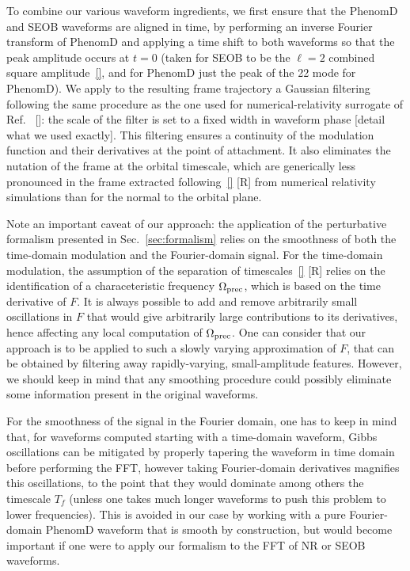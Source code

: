 \documentclass[aps,showpacs,twocolumn,
prd,superscriptaddress,nofootinbib]{revtex4-1}
\newcommand{\Tf}{T_{f}}
\newcommand{\SM}[1]{{\color{Red} #1}}
\begin{document}
To combine our various waveform ingredients, we first ensure that the PhenomD and SEOB waveforms are aligned in time, by performing an inverse Fourier transform of PhenomD and applying a time shift to both waveforms so that the peak amplitude occurs at $t=0$ (taken for SEOB to be the $\ell=2$ combined square amplitude~\eqref{}, and for PhenomD just the peak of the 22 mode for PhenomD). We apply to the resulting frame trajectory a Gaussian filtering following the same procedure as the one used for numerical-relativity surrogate of Ref.~\cite{} \SM{[]}: the scale of the filter is set to a fixed width in waveform phase \SM{[detail what we used exactly]}. This filtering ensures a continuity of the modulation function and their derivatives at the point of attachment. It also eliminates the nutation of the frame at the orbital timescale, which are generically less pronounced in the frame extracted following~\eqref{} \SM{[R]} from numerical relativity simulations than for the normal to the orbital plane.

Note an important caveat of our approach: the application of the perturbative formalism presented in Sec.~\ref{sec:formalism} relies on the smoothness of both the time-domain modulation and the Fourier-domain signal. For the time-domain modulation, the assumption of the separation of timescales~\eqref{} \SM{[R]} relies on the identification of a characeteristic frequency $\Omega_{\rm prec}$, which is based on the time derivative of $F$. It is always possible to add and remove arbitrarily small oscillations in $F$ that would give arbitrarily large contributions to its derivatives, hence affecting any local computation of $\Omega_{\rm prec}$. One can consider that our approach is to be applied to such a slowly varying approximation of $F$, that can be obtained by filtering away rapidly-varying, small-amplitude features. However, we should keep in mind that any smoothing procedure could possibly eliminate  some information present in the original waveforms.

For the smoothness of the signal in the Fourier domain, one has to keep in mind that, for waveforms computed starting with a time-domain waveform, Gibbs oscillations can be mitigated by properly tapering the waveform in time domain before performing the FFT, however taking Fourier-domain derivatives magnifies this oscillations, to the point that they would dominate among others the timescale $\Tf$ (unless one takes much longer waveforms to push this problem to lower frequencies). This is avoided in our case by working with a pure Fourier-domain PhenomD waveform that is smooth by construction, but would become important if one were to apply our formalism to the FFT of NR or SEOB waveforms.
\end{document}
